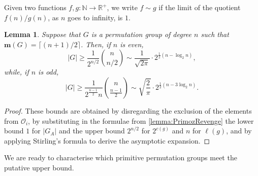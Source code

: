 \documentclass[a4paper]{amsart}
\newcommand{\m}{\mathbf{m}}
\newcommand{\NN}{\mathbb{N}}
\newtheorem{lemma}[theorem]{Lemma}
\theoremstyle{definition}
\begin{document}
Given two functions $f,g: \NN \to \mathbb{R}^+$, we write $f \sim g$ if the limit of the quotient $f(n)/g(n)$, as $n$ goes to infinity, is $1$.
\begin{lemma}\label{lemma:MarusaRevenge}
    Suppose that $G$ is a permutation group of degree $n$ such that $\m(G) = \lceil (n+1)/2 \rceil$. Then, if $n$ is even,
    \[ |G| \geq \frac{1}{2^{n/2}} {n \choose n/2} \sim \frac{1}{\sqrt{2\pi}} \cdot 2^{\frac{1}{2} (n - \log_2n)} ,\]
    while, if $n$ is odd,
    \[ |G| \geq \frac{1}{2^{\frac{n-1}{2}}n} {n \choose \frac{n-1}{2}} \sim \sqrt{\frac{2}{\pi}} \cdot 2^{\frac{1}{2} (n - 3\log_2 n)} .\]
\end{lemma}
\begin{proof}
    These bounds are obtained by disregarding the exclusion of the elements from $\mathcal{O}_i$, by substituting in the formulae from \cref{lemma:PrimozRevenge} the lower bound $1$ for $|G_A|$ and the upper bound $2^{n/2}$ for $2^{c(g)}$ and $n$ for $\ell(g)$, and by applying Stirling's formula to derive the asymptotic expansion.
\end{proof}

We are ready to characterise which primitive permutation groups
meet the putative upper bound.
\end{document}
